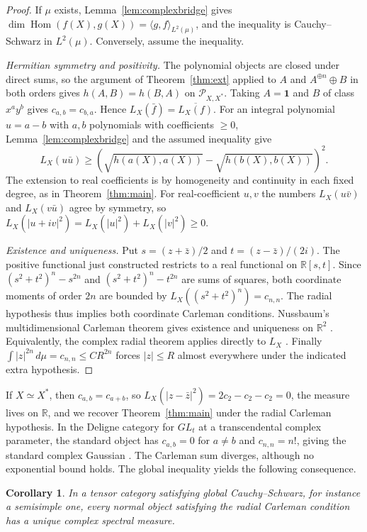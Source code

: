 \documentclass[11pt,reqno]{amsart}
\newtheorem{corollary}[theorem]{Corollary}
\theoremstyle{definition}
\newcommand{\Hom}{\operatorname{Hom}}
\newcommand{\one}{\mathbf 1}
\newcommand{\RR}{\mathbb R}
\begin{document}
\begin{proof}
If $\mu$ exists, Lemma~\ref{lem:complexbridge} gives $\dim\Hom(f(X),g(X))=\langle g,f\rangle_{L^2(\mu)}$, and the inequality is Cauchy--Schwarz in $L^2(\mu)$. Conversely, assume the inequality.

\emph{Hermitian symmetry and positivity.}
The polynomial objects are closed under direct sums, so the
argument of Theorem~\ref{thm:ext} applied to $A$ and $A^{\oplus n}\oplus B$
in both orders gives $h(A,B)=h(B,A)$ on $\mathcal P_{X,X^*}$. Taking
$A=\one$ and $B$ of class $x^ay^b$ gives $c_{a,b}=c_{b,a}$. Hence
$L_X(\bar f)=\overline{L_X(f)}$.
For an integral polynomial $u=a-b$ with $a,b$ polynomials with coefficients $\geq0$,
Lemma~\ref{lem:complexbridge} and the assumed inequality give
\[
  L_X(u\bar u)\ge
  \left(\sqrt{h(a(X),a(X))}-\sqrt{h(b(X),b(X))}\right)^2.
\]
The extension to real coefficients is by homogeneity and continuity in
each fixed degree, as in Theorem~\ref{thm:main}. For real-coefficient
$u,v$ the numbers $L_X(u\bar v)$ and $L_X(v\bar u)$ agree by symmetry,
so $L_X(|u+iv|^2)=L_X(|u|^2)+L_X(|v|^2)\ge0$.

\emph{Existence and uniqueness.} Put $s=(z+\bar z)/2$ and $t=(z-\bar z)/(2i)$. The positive functional just constructed restricts to a real functional on $\RR[s,t]$. Since $(s^2+t^2)^n-s^{2n}$ and $(s^2+t^2)^n-t^{2n}$ are sums of squares, both coordinate moments of order $2n$ are bounded by $L_X((s^2+t^2)^n)=c_{n,n}$. The radial hypothesis thus implies both coordinate Carleman conditions. Nussbaum's multidimensional Carleman theorem gives existence and uniqueness on $\RR^2$ \cite[Theorem~14.20]{Sch}. Equivalently, the complex radial theorem applies directly to $L_X$ \cite[Theorem~15.11]{Sch}. Finally $\int|z|^{2n}\,d\mu=c_{n,n}\le CR^{2n}$ forces $|z|\le R$ almost everywhere under the indicated extra hypothesis.
\end{proof}

If $X\simeq X^*$, then $c_{a,b}=c_{a+b}$, so $L_X(|z-\bar z|^2)=2c_2-c_2-c_2=0$, the measure lives on $\RR$, and we recover Theorem~\ref{thm:main} under the radial Carleman hypothesis. In the Deligne category for $GL_t$ at a transcendental complex parameter, the standard object has $c_{a,b}=0$ for $a\ne b$ and $c_{n,n}=n!$, giving the standard complex Gaussian \cite[\S3.3]{FFK}. The Carleman sum diverges, although no exponential bound holds. The global inequality yields the following consequence.

\begin{corollary}\label{cor:complexglobal}
In a tensor category satisfying global Cauchy--Schwarz, for instance a semisimple one, every normal object satisfying the radial Carleman condition has a unique complex spectral measure.
\end{corollary}
\end{document}
